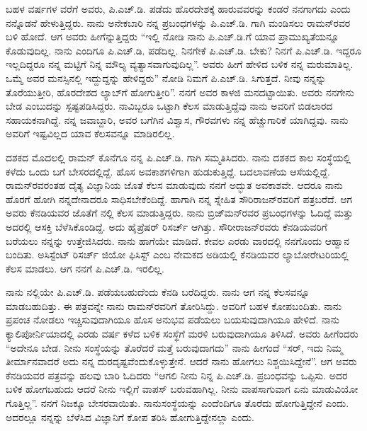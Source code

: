 ಬಹಳ ವರ್ಷಗಳ ವರೆಗೆ ಅವರು, ಪಿ.ಎಚ್.ಡಿ. ಪಡೆದು ಹೊರದೇಶಕ್ಕೆ ಹಾರುವವರನ್ನು ಕಂಡರೆ ನನಗಾಗದು ಎಂದು ನನ್ನೊಡನೆ ಹೇಳುತ್ತಿದ್ದರು. ನಾನು ಅನೇಕಬಾರಿ ನನ್ನ ಪ್ರಬಂಧಗಳನ್ನು ಪಿ.ಎಚ್.ಡಿ. ಗಾಗಿ ಮಂಡಿಸಲು ರಾಮನ್‍ರವರ ಬಳಿ ಹೋದೆ. ಆಗ ಅವರು ಹೀಗೆನ್ನುತ್ತಿದ್ದರು \enginline{-}“ಇಲ್ಲಿ ನೋಡಿ ನಾನು ಪಿ.ಎಚ್.ಡಿ.ಗೆ ಯಾವ ಪ್ರಾಮುಖ್ಯತೆಯನ್ನೂ ಕೊಡುವುದಿಲ್ಲ. ನಾನು ಎಂದಿಗೂ ಪಿ.ಎಚ್.ಡಿ. ಪಡೆದಿಲ್ಲ. ನಿನಗೇಕೆ ಪಿ.ಎಚ್.ಡಿ. ಬೇಕು? ನಿನಗೆ ಪಿ.ಎಚ್.ಡಿ. ಇದ್ದರೂ ಇಲ್ಲದಿದ್ದರೂ ನನ್ನ ಮಟ್ಟಿಗೆ ನಿನ್ನ ಮೌಲ್ಯ ವ್ಯತ್ಯಾಸವಾಗುವುದಿಲ್ಲ”. ಅವರು ಹೀಗೆ ಹೇಳಿದ ಬಳಿಕ ನನ್ನ ಮರುಮಾತಿಲ್ಲ. ಒಮ್ಮೆ ಅವರ ಮನಸ್ಸಿನಲ್ಲಿ ಇದ್ದುದ್ದನ್ನು ಹೇಳಿದ್ದರು” ನೋಡಿ ನಿಮಗೆ ಪಿ.ಎಚ್.ಡಿ. ಸಿಗುತ್ತದೆ. ನೀವು ನನ್ನನ್ನು ತೊರೆಯುತ್ತೀರಿ, ಹೊರದೇಶದ ಲ್ಯಾಬ್‍ಗೆ ಹೋಗುತ್ತೀರಿ”. ನನಗೆ ಅವರ ಕಾಳಜಿ ಮನದಟ್ಟಾಯಿತು. ಅವರು ನನಗೇನು ಬೇಡ ಎಂಬುದನ್ನು ಸ್ಪಷ್ಟಪಡಿಸಿದ್ದರು. ನಾವಿಬ್ಬರೂ ಒಟ್ಟಾಗಿ ಕೆಲಸ ಮಾಡುತ್ತಿದ್ದೆವು ನಾನು ಅವರಿಗೆ ಬಿಡಲಾರದ ಸಹಾಯಕನಾಗಿದ್ದೆ. ನನ್ನ ಜವಾಬ್ದಾರಿ, ಅವರ ಬಗೆಗಿನ ವಿಶ್ವಾಸ, ಗೌರವಗಳು ನನ್ನ ಹೆಚ್ಚುಗಾರಿಕೆ ಯಾಗಿದ್ದವು. ನಾನು ಅವರಿಗೆ ಇಷ್ಟವಿಲ್ಲದ ಯಾವ ಕೆಲಸವನ್ನೂ ಮಾಡಿರಲಿಲ್ಲ.

 ದಶಕದ ಮೊದಲಲ್ಲಿ ರಾಮನ್ ಕೊನೆಗೂ ನನ್ನ ಪಿ.ಎಚ್.ಡಿ. ಗಾಗಿ ಸಮ್ಮತಿಸಿದರು. ನಾನು ದಶಕದ ಕಾಲ ಸಂಸ್ಥೆಯಲ್ಲಿ ಕಳೆದು ಒಂದು ಬಗೆ ಬೇಸರದಲ್ಲಿದ್ದೆ. ಹೊಸ ಅವಕಾಶಗಳಿಗಾಗಿ ಹುಡುಕುತ್ತಿದ್ದೆ. ಬದಲಾವಣೆಯ ಆಸೆಯಲ್ಲಿದ್ದೆ. ರಾಮನ್‍ರವರಂತಹ ದೈತ್ಯ ವಿಜ್ಞಾನಿಯ ಜೊತೆ ಕೆಲಸ ಮಾಡುವುದು ನನಗೆ ಅದ್ಭುತ ಅವಕಾಶವೇ. ಆದರೂ ನಾನು ಹೊರಗೆ ಹೋಗಿ ನನ್ನದೇನಾದರೂ ಸಾಧಿಸಬೇಕೆಂದಿದ್ದೆ. ಹಾಗಾಗಿ ನನ್ನ ಸ್ನೇಹಿತ ಸೌರಿರಾಜನ್‍ರವರಿಗೆ ಪತ್ರಬರೆದೆ. ಆಗ ಅವರು ಕೆನಡಿಯವರ ಜೊತೆಗೆ  ನಲ್ಲಿ ಕೆಲಸ ಮಾಡುತ್ತಿದ್ದರು. ನಾನು ಬ್ರಿಜ್‍ಮನ್‍ರವರ ಪ್ರಬಂಧಗಳನ್ನು ಓದಿದ್ದೆ ಮತ್ತು ಅದರಲ್ಲಿ ಆಸಕ್ತಿ ಬೆಳೆಸಿಕೊಂಡಿದ್ದೆ. ಅದು ಹೈಪ್ರೆಷರ್ ರಿಸರ್ಚ್ ಆಗಿತ್ತು. ಸೌರೀರಾಜನ್‍\-ರವರು ಕೆನಡಿಯವರಿಗೆ ಬರೆಯಲು ನನ್ನನ್ನು ಉತ್ತೇಜಿಸಿದರು. ನಾನು ಹಾಗೆಯೇ ಮಾಡಿದೆ. ಕೇವಲ ಎರಡು ವಾರದಲ್ಲಿ ನನಗೊಂದು ಆಹ್ವಾನ ಬಂದಿತು. ಅಸಿಸ್ಟೆಂಟ್ ರಿಸರ್ಚ್ ಜಿಯೋ ಫಿಸಿಸ್ಟ್ ಎಂಬ ನೇಮಕದ ಅಡಿಯಲ್ಲಿ ಕೆನಡಿಯವರ ಲ್ಯಾಬೋರೇಟರಿಯಲ್ಲಿ ಕೆಲಸ ಮಾಡಲು. ಆಗ ನನಗೆ ಪಿ.ಎಚ್.ಡಿ. ಇರಲಿಲ್ಲ.

ನಾನು  ನಲ್ಲಿಯೇ ಪಿ.ಎಚ್.ಡಿ. ಪಡೆಯಬಹುದೆಂದು ಕೆನಡಿ ಬರೆದಿದ್ದರು. ನಾನು ಆಗ ನನ್ನ ಕೆಲಸವನ್ನೂ ಮಾಡಬಹುದಿತ್ತು. ಈ ಪತ್ರವನ್ನೇ ನಾನು ರಾಮನ್‍ರವರಿಗೆ ತೋರಿಸಿದ್ದು. ಅವರಿಗೆ ಬಹಳ ಕೋಪಬಂದಿತು. ನಾನು ಪ್ರಪಂಚ ನೋಡಲು ಇಚ್ಚಿಸುವುದಾಗಿಯೂ ಹೊಸ ಅನುಭವ ಪಡೆಯಲು ಬಯಸುವುದಾಗಿಯೂ ಹೇಳಿದೆ. ನಾನು ಕ್ಯಾಲಿಪೋರ್ನಿಯಾದಲ್ಲಿ ಎರಡು ವರ್ಷ ಕಳೆದ ಬಳಿಕ ಸಂಸ್ಥೆಗೆ ಮರಳಿ ಬರುವುದಾಗಿಯೂ ತಿಳಿಸಿದೆ. ಅವರು ಹೀಗೆಂದರು “ಅದೇನೂ ಬೇಡ. ನೀನು ಸಂಸ್ಥೆಯನ್ನು ತೊರೆದರೆ ಮತ್ತೆ ಬರುವುದಾಗದು” ನಾನು ಹೀಗಂದೆ “ಸರ್, ಇದು ನಿಮ್ಮ ತೀರ್ಮಾನವಾದರೆ ಅದು ನನ್ನ ದುರದೃಷ್ಟವೆಂದುಕೊಳ್ಳುತ್ತೇನೆ. ಆದರೆ ನಾನು ಹೋಗಲು ನಿಶ್ಚಯಿಸಿದ್ದೇನೆ”. ಆಗ ಅವರು ಕೆನಡಿಯವರ ಪತ್ರವನ್ನು ಹಲವು ಬಾರಿ ಓದಿದರು “ಆಗಲಿ ನೀನು ನಿನ್ನ ಪಿ.ಎಚ್.ಡಿ. ಪ್ರಬಂಧವನ್ನು ಒಪ್ಪಿಸು. ಅದರ ಬಳಿಕ ಹೋಗಬಹುದು ಆದರೆ ನೀನು ಇಲ್ಲಿಗೆ ವಾಪಸ್ ಬರುವಹಾಗಿಲ್ಲ. ನೀನು ವಾಪಸಾಗುವಾಗ ಏನು ಮಾಡುವಿಯೋ ಗೊತ್ತಿಲ್ಲ”. ನನಗೆ ನಿಜಕ್ಕೂ ಬೇಸರವಾಯಿತು. ನಾನು\break ಸಂಸ್ಥೆಯನ್ನು ಎಂದೆಂದಿಗೂ ತೊರೆದು ಹೋಗುತ್ತಿದ್ದೇನೆ ಎಂದು. ಅದರಲ್ಲೂ ನನ್ನನ್ನು ಬೆಳೆಸಿದ ವಿಜ್ಞಾನಿಗೆ ಕೋಪ ತರಿಸಿ ಹೋಗುತ್ತಿದ್ದೇನಲ್ಲಾ ಎಂದು.

